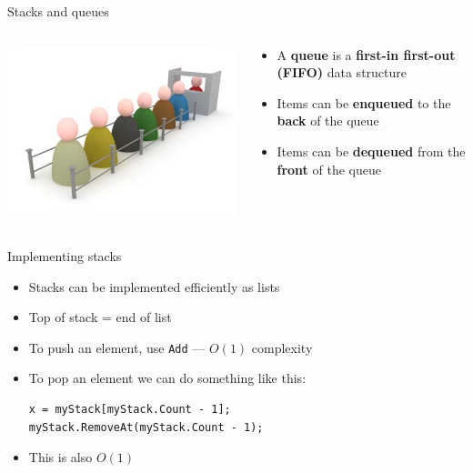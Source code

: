 \begin{frame}{Stacks and queues}
\begin{columns}
\begin{column}{0.3\textwidth}
			\includegraphics[width=\textwidth]{queue}
		\end{column}
		\begin{column}{0.68\textwidth}
			\begin{itemize}
				\item A \textbf{queue} is a \textbf{first-in first-out (FIFO)} data structure
				\pause\item Items can be \textbf{enqueued} to the \textbf{back} of the queue
				\pause\item Items can be \textbf{dequeued} from the \textbf{front} of the queue
			\end{itemize}
		\end{column}
	\end{columns}
\end{frame}

\begin{frame}[fragile]{Implementing stacks}
	\begin{itemize}
		\pause\item Stacks can be implemented efficiently as lists
		\pause\item Top of stack = end of list
		\pause\item To push an element, use \lstinline{Add} --- $O(1)$ complexity
		\pause\item To pop an element we can do something like this:
			\begin{lstlisting}
x = myStack[myStack.Count - 1];
myStack.RemoveAt(myStack.Count - 1);
			\end{lstlisting}
		\pause\item This is also $O(1)$
	\end{itemize}
\end{frame}

